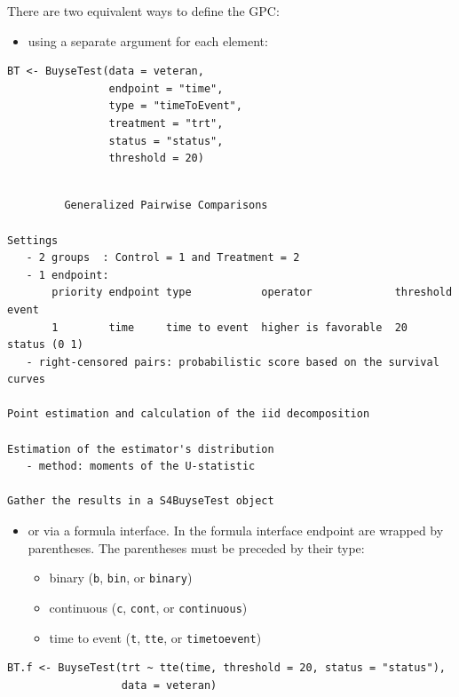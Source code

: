 \documentclass[12pt]{article}
\begin{document}
\bigskip

There are two equivalent ways to define the GPC: 
\begin{itemize}
\item using a separate argument for each element:
\end{itemize}

\lstset{language=r,label= ,caption= ,captionpos=b,numbers=none}
\begin{lstlisting}
BT <- BuyseTest(data = veteran, 
                endpoint = "time", 
                type = "timeToEvent", 
                treatment = "trt", 
                status = "status", 
                threshold = 20)
\end{lstlisting}

\begin{verbatim}

         Generalized Pairwise Comparisons

Settings 
   - 2 groups  : Control = 1 and Treatment = 2
   - 1 endpoint: 
       priority endpoint type           operator             threshold event       
       1        time     time to event  higher is favorable  20        status (0 1)
   - right-censored pairs: probabilistic score based on the survival curves 

Point estimation and calculation of the iid decomposition

Estimation of the estimator's distribution 
   - method: moments of the U-statistic

Gather the results in a S4BuyseTest object
\end{verbatim}

\clearpage

\begin{itemize}
\item or via a formula interface. In the formula interface endpoint are
wrapped by parentheses. The parentheses must be preceded by their
type: 
\begin{itemize}[label={-}]
\item binary (\texttt{b}, \texttt{bin}, or \texttt{binary})
\item continuous (\texttt{c}, \texttt{cont}, or  \texttt{continuous})
\item time to event (\texttt{t}, \texttt{tte}, or \texttt{timetoevent})
\end{itemize}
\end{itemize}

\lstset{language=r,label= ,caption= ,captionpos=b,numbers=none}
\begin{lstlisting}
BT.f <- BuyseTest(trt ~ tte(time, threshold = 20, status = "status"),
                  data = veteran)
\end{lstlisting}
\end{document}
